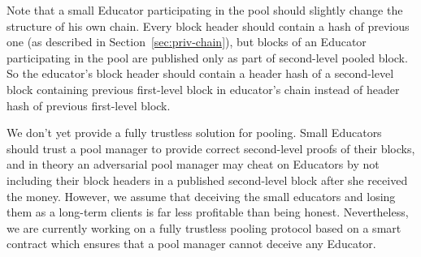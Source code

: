 Note that a small Educator participating in the pool should slightly change the
structure of his own chain. Every block header should contain a hash of previous
one (as described in Section~\ref{sec:priv-chain}), but blocks of an Educator
participating in the pool are published only as part of second-level pooled
block. So the educator's block header should contain a header hash of a
second-level block containing previous first-level block in educator's chain
instead of header hash of previous first-level block.

We don't yet provide a fully trustless solution for pooling. Small Educators
should trust a pool manager to provide correct second-level proofs of their
blocks, and in theory an adversarial pool manager may cheat on Educators by not
including their block headers in a published second-level block after she
received the money. However, we assume that deceiving the small educators and
losing them as a long-term clients is far less profitable than being honest.
Nevertheless, we are currently working on a fully trustless pooling protocol
based on a smart contract which ensures that a pool manager cannot deceive any
Educator.
